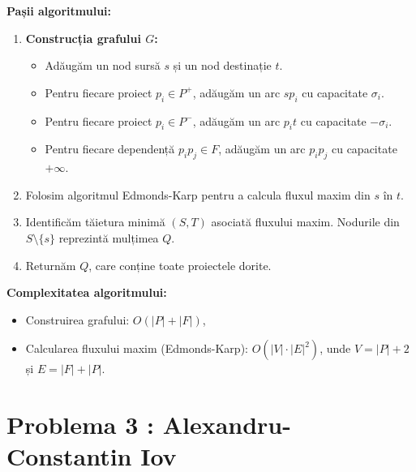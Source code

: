 \documentclass{article}
\begin{document}
{\textbf{Pașii algoritmului:}
\begin{enumerate}
    \item \textbf{Construcția grafului \( G \):}
    \begin{itemize}
        \item Adăugăm un nod sursă \( s \) și un nod destinație \( t \).
        \item Pentru fiecare proiect \( p_i \in P^+ \), adăugăm un arc \( sp_i \) cu capacitate \( \sigma_i \).
        \item Pentru fiecare proiect \( p_i \in P^- \), adăugăm un arc \( p_i t \) cu capacitate \( -\sigma_i \).
        \item Pentru fiecare dependență \( p_i p_j \in F \), adăugăm un arc \( p_i p_j \) cu capacitate \( +\infty \).
    \end{itemize}
    
    \item Folosim algoritmul Edmonds-Karp pentru a calcula fluxul maxim din \( s \) în \( t \).
    
    \item Identificăm tăietura minimă \((S, T)\) asociată fluxului maxim. Nodurile din \( S \setminus \{s\} \) reprezintă mulțimea \( Q \).
    
    \item Returnăm \( Q \), care conține toate proiectele dorite.
\end{enumerate}

\textbf{Complexitatea algoritmului:}
\begin{itemize}
    \item Construirea grafului: \( O(|P| + |F|) \),
    \item Calcularea fluxului maxim (Edmonds-Karp): \( O(|V| \cdot |E|^2) \), unde \( V = |P| + 2 \) și \( E = |F| + |P| \).
\end{itemize}

}

\section*{\fontsize{20}{50}\selectfont Problema 3 : Alexandru-Constantin Iov}
\end{document}
